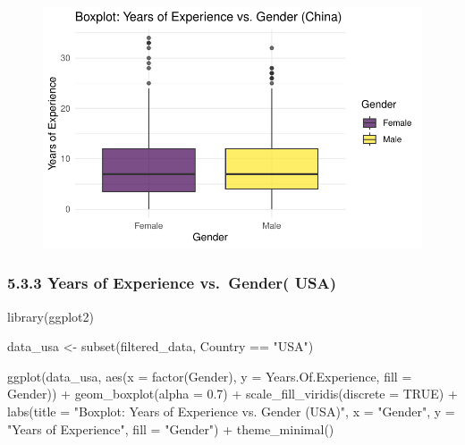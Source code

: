 \documentclass[
  letterpaper,
  DIV=11,
  numbers=noendperiod]{scrartcl}
\newenvironment{Shaded}{\begin{snugshade}}{\end{snugshade}}
\newcommand{\AttributeTok}[1]{\textcolor[rgb]{0.40,0.45,0.13}{#1}}
\newcommand{\ConstantTok}[1]{\textcolor[rgb]{0.56,0.35,0.01}{#1}}
\newcommand{\FloatTok}[1]{\textcolor[rgb]{0.68,0.00,0.00}{#1}}
\newcommand{\FunctionTok}[1]{\textcolor[rgb]{0.28,0.35,0.67}{#1}}
\newcommand{\NormalTok}[1]{\textcolor[rgb]{0.00,0.23,0.31}{#1}}
\newcommand{\OtherTok}[1]{\textcolor[rgb]{0.00,0.23,0.31}{#1}}
\newcommand{\SpecialCharTok}[1]{\textcolor[rgb]{0.37,0.37,0.37}{#1}}
\newcommand{\StringTok}[1]{\textcolor[rgb]{0.13,0.47,0.30}{#1}}
\begin{document}
\begin{figure}[H]

{\centering \includegraphics{main_doc_files/figure-pdf/unnamed-chunk-54-1.pdf}

}

\end{figure}

\hypertarget{years-of-experience-vs.-gender-usa}{%
\subsubsection{5.3.3 Years of Experience vs.~Gender(
USA)}\label{years-of-experience-vs.-gender-usa}}

\begin{Shaded}
\begin{Highlighting}[]
\FunctionTok{library}\NormalTok{(ggplot2)}

\NormalTok{data\_usa }\OtherTok{\textless{}{-}} \FunctionTok{subset}\NormalTok{(filtered\_data, Country }\SpecialCharTok{==} \StringTok{"USA"}\NormalTok{)}

\FunctionTok{ggplot}\NormalTok{(data\_usa, }\FunctionTok{aes}\NormalTok{(}\AttributeTok{x =} \FunctionTok{factor}\NormalTok{(Gender), }\AttributeTok{y =}\NormalTok{ Years.Of.Experience, }\AttributeTok{fill =}\NormalTok{ Gender)) }\SpecialCharTok{+}
  \FunctionTok{geom\_boxplot}\NormalTok{(}\AttributeTok{alpha =} \FloatTok{0.7}\NormalTok{) }\SpecialCharTok{+}
  \FunctionTok{scale\_fill\_viridis}\NormalTok{(}\AttributeTok{discrete =} \ConstantTok{TRUE}\NormalTok{) }\SpecialCharTok{+}
  \FunctionTok{labs}\NormalTok{(}\AttributeTok{title =} \StringTok{"Boxplot: Years of Experience vs. Gender (USA)"}\NormalTok{,}
       \AttributeTok{x =} \StringTok{"Gender"}\NormalTok{,}
       \AttributeTok{y =} \StringTok{"Years of Experience"}\NormalTok{,}
       \AttributeTok{fill =} \StringTok{"Gender"}\NormalTok{) }\SpecialCharTok{+}
  \FunctionTok{theme\_minimal}\NormalTok{()}
\end{Highlighting}
\end{Shaded}
\end{document}
